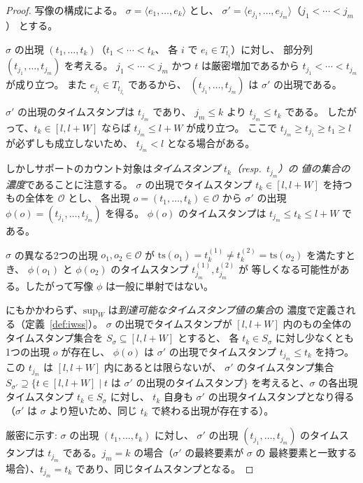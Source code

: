 \documentclass[11pt,a4paper]{article}
\begin{document}
\begin{proof}
写像の構成による。
$\sigma = \langle e_1, \ldots, e_k \rangle$ とし、
$\sigma' = \langle e_{j_1}, \ldots, e_{j_m} \rangle$（$j_1 < \cdots < j_m$）
とする。

$\sigma$ の出現 $(t_1, \ldots, t_k)$（$t_1 < \cdots < t_k$、
各 $i$ で $e_i \in T_{t_i}$）に対し、
部分列 $(t_{j_1}, \ldots, t_{j_m})$ を考える。
$j_1 < \cdots < j_m$ かつ $t$ は厳密増加であるから
$t_{j_1} < \cdots < t_{j_m}$ が成り立つ。
また $e_{j_i} \in T_{t_{j_i}}$ であるから、
$(t_{j_1}, \ldots, t_{j_m})$ は $\sigma'$ の出現である。

$\sigma'$ の出現のタイムスタンプは $t_{j_m}$ であり、
$j_m \le k$ より $t_{j_m} \le t_k$ である。
したがって、$t_k \in [l, l+W]$ ならば $t_{j_m} \le l+W$ が成り立つ。
ここで $t_{j_m} \ge t_{j_1} \ge t_1 \ge l$ が必ずしも成立しないため、
$t_{j_m} < l$ となる場合がある。

しかしサポートのカウント対象は\emph{タイムスタンプ $t_k$（resp.\ $t_{j_m}$）の
値の集合の濃度}であることに注意する。
$\sigma$ の出現でタイムスタンプ $t_k \in [l, l+W]$ を持つもの全体を $\mathcal{O}$ とし、
各出現 $o = (t_1, \ldots, t_k) \in \mathcal{O}$ から
$\sigma'$ の出現 $\phi(o) = (t_{j_1}, \ldots, t_{j_m})$ を得る。
$\phi(o)$ のタイムスタンプは $t_{j_m} \le t_k \le l+W$ である。

$\sigma$ の異なる2つの出現 $o_1, o_2 \in \mathcal{O}$ が
$\text{ts}(o_1) = t_k^{(1)} \neq t_k^{(2)} = \text{ts}(o_2)$ を満たすとき、
$\phi(o_1)$ と $\phi(o_2)$ のタイムスタンプ $t_{j_m}^{(1)}, t_{j_m}^{(2)}$ が
等しくなる可能性がある。したがって写像 $\phi$ は一般に単射ではない。

にもかかわらず、$\mathrm{sup}_W$ は\emph{到達可能なタイムスタンプ値の集合}の
濃度で定義される（定義~\ref{def:iwss}）。
$\sigma$ の出現でタイムスタンプが $[l, l+W]$ 内のもの全体の
タイムスタンプ集合を $S_\sigma \subseteq [l, l+W]$ とすると、
各 $t_k \in S_\sigma$ に対し少なくとも1つの出現 $o$ が存在し、
$\phi(o)$ は $\sigma'$ の出現でタイムスタンプ $t_{j_m} \le t_k$ を持つ。
この $t_{j_m}$ は $[l, l+W]$ 内にあるとは限らないが、
$\sigma'$ のタイムスタンプ集合 $S_{\sigma'} \supseteq
\{t \in [l,l+W] \mid t \text{ は } \sigma' \text{ の出現のタイムスタンプ}\}$
を考えると、$\sigma$ の各出現タイムスタンプ $t_k \in S_\sigma$ に対し、
$t_k$ 自身も $\sigma'$ の出現タイムスタンプとなり得る
（$\sigma'$ は $\sigma$ より短いため、同じ $t_k$ で終わる出現が存在する）。

厳密に示す: $\sigma$ の出現 $(t_1, \ldots, t_k)$ に対し、
$\sigma'$ の出現 $(t_{j_1}, \ldots, t_{j_m})$ のタイムスタンプは
$t_{j_m}$ である。$j_m = k$ の場合（$\sigma'$ の最終要素が $\sigma$ の
最終要素と一致する場合）、$t_{j_m} = t_k$ であり、同じタイムスタンプとなる。


\end{proof}
\end{document}
